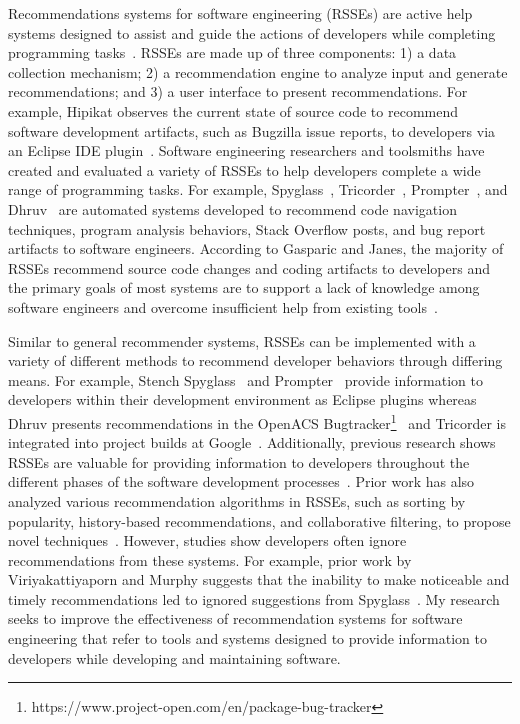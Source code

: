 Recommendations systems for software engineering (RSSEs) are active help systems designed to assist and guide the actions of developers while completing programming tasks~\cite{RSSE}. RSSEs are made up of three components: 1) a data collection mechanism; 2) a recommendation engine to analyze input and generate recommendations; and 3) a user interface to present recommendations. For example, Hipikat observes the current state of source code to recommend software development artifacts, such as Bugzilla issue reports, to developers via an Eclipse IDE plugin~\cite{Hipikat}. Software engineering researchers and toolsmiths have created and evaluated a variety of RSSEs to help developers complete a wide range of programming tasks. For example, Spyglass~\cite{Spyglass}, Tricorder~\cite{Tricorder}, Prompter~\cite{Prompter}, and Dhruv~\cite{Dhruv} are automated systems developed to recommend code navigation techniques, program analysis behaviors, Stack Overflow posts, and bug report artifacts to software engineers. According to Gasparic and Janes, the majority of RSSEs recommend source code changes and coding artifacts to developers and the primary goals of most systems are to support a lack of knowledge among software engineers and overcome insufficient help from existing tools~\cite{Gasparic16RSSEReview}.

Similar to general recommender systems, RSSEs can be implemented with a variety of different methods to recommend developer behaviors through differing means. For example, Stench Spyglass~\cite{Spyglass} and Prompter~\cite{Prompter} provide information to developers within their development environment as Eclipse plugins whereas Dhruv presents recommendations in the OpenACS Bugtracker\footnote{https://www.project-open.com/en/package-bug-tracker}~\cite{Dhruv} and Tricorder is integrated into project builds at Google~\cite{Tricorder}. Additionally, previous research shows RSSEs are valuable for providing information to developers throughout the different phases of the software development processes~\cite{Pak2014RSSESDLC}. Prior work has also analyzed various recommendation algorithms in RSSEs, such as sorting by popularity, history-based recommendations, and collaborative filtering, to propose novel techniques~\cite{Murphy-Hill2012Fluency}. However, studies show developers often ignore recommendations from these systems. For example, prior work by Viriyakattiyaporn and Murphy suggests that the inability to make noticeable and timely recommendations led to ignored suggestions from Spyglass~\cite{viriyakattiyaporn2009challenges}. My research seeks to improve the effectiveness of recommendation systems for software engineering that refer to tools and systems designed to provide information to developers while developing and maintaining software.

